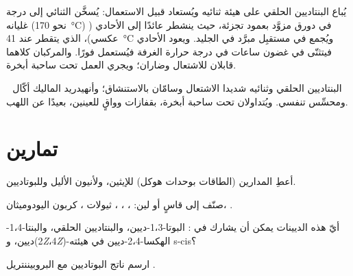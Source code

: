 \begin{inthelab}
يُباع البنتاديين الحلقي على هيئة ثنائيه ويُستعاد قبيل الاستعمال: يُسخَّن الثنائي
إلى درجة غليانه (نحو \qty{170}{\degreeCelsius}) في دورق مزوَّد
بعمود تجزئة، حيث ينشطر عائدًا إلى الأحادي (
عكسي)، الذي يتقطر عند \qty{41}{\degreeCelsius} ويُجمع في مستقبِل مبرَّد
في الجليد. ويعود الأحادي فيتثنّى في غضون ساعات في درجة حرارة الغرفة فيُستعمل
فورًا. والمركبان كلاهما قابلان للاشتعال وضاران؛ ويجري العمل تحت ساحبة أبخرة.
\end{inthelab}

\begin{safety}{\,\,}
البنتاديين الحلقي وثنائيه شديدا الاشتعال وسامّان بالاستنشاق؛ وأنهيدريد الماليك
أكّال ومحسِّس تنفسي. ويُتداولان تحت ساحبة أبخرة،
بقفازات وواقٍ للعينين، بعيدًا عن اللهب.
\end{safety}

\section{تمارين}

\begin{exercise}[$\star$]\label{exo:b2:frontier-orbitals:1}
أعطِ المدارين   (الطاقات بوحدات هوكل) للإيثين، ولأنيون الأليل
وللبوتاديين.
\end{exercise}

\begin{exercise}[$\star$]\label{exo:b2:frontier-orbitals:2}
صنّف إلى قاسٍ أو لين: ، ، ، ثيولات ، كربون
اليودوميثان، .
\end{exercise}

\begin{exercise}[$\star$]\label{exo:b2:frontier-orbitals:3}
أيّ هذه الديينات يمكن أن يشارك في : البوتا-1،3-ديين،
والبنتاديين الحلقي، والبنتا-1،4-ديين، و(2\textit{Z}،4\textit{Z})-الهكسا-2،4-ديين في هيئته
s-cis؟
\end{exercise}

\begin{exercise}[$\star$]\label{exo:b2:frontier-orbitals:4}
ارسم ناتج البوتاديين مع البروبيننتريل .
\end{exercise}

